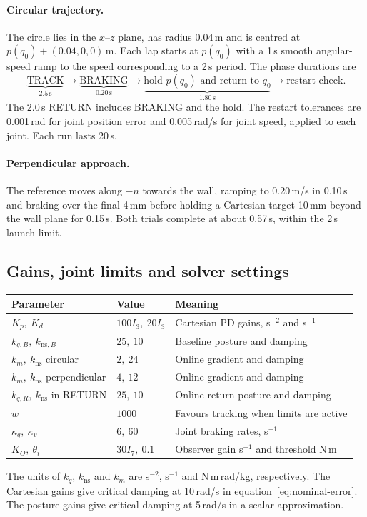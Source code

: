 \documentclass[11pt,a4paper]{article}
\begin{document}
\paragraph{Circular trajectory.}
The circle lies in the $x$--$z$ plane, has radius 0.04\,m and is centred at
$p(q_0)+(0.04,0,0)$\,m. Each lap starts at $p(q_0)$ with a 1\,s smooth
angular-speed ramp to the speed corresponding to a 2\,s period. The phase
durations are
\[
 \underbrace{\mathrm{TRACK}}_{2.5\,\mathrm{s}}
 \longrightarrow
 \underbrace{\mathrm{BRAKING}}_{0.20\,\mathrm{s}}
 \longrightarrow
 \underbrace{\text{hold }p(q_0)\text{ and return to }q_0}_{1.80\,\mathrm{s}}
 \longrightarrow
 \text{restart check}.
\]
The 2.0\,s RETURN includes BRAKING and the hold. The restart tolerances
are 0.001\,rad for joint position error and 0.005\,rad/s for joint speed,
applied to each joint. Each run lasts 20\,s.

\paragraph{Perpendicular approach.}
The reference moves along $-n$ towards the wall, ramping to 0.20\,m/s in
0.10\,s and braking over the final 4\,mm before holding a Cartesian target
10\,mm beyond the wall plane for 0.15\,s. Both trials complete at about
0.57\,s, within the 2\,s launch limit.

\subsection{Gains, joint limits and solver settings}
\begin{center}
\begin{tabular}{lll}
\toprule
Parameter & Value & Meaning\\
\midrule
$K_p,\ K_d$ & $100I_3,\ 20I_3$ & Cartesian PD gains, s$^{-2}$ and s$^{-1}$\\
$k_{q,B},\ k_{\mathrm{ns},B}$ & $25,\ 10$ & Baseline posture and damping\\
$k_m,\ k_{\mathrm{ns}}$ circular & $2,\ 24$ & Online gradient and damping\\
$k_m,\ k_{\mathrm{ns}}$ perpendicular & $4,\ 12$ & Online gradient and damping\\
$k_{q,R},\ k_{\mathrm{ns}}$ in RETURN & $25,\ 10$ & Online return posture and damping\\
$w$ & $1000$ & Favours tracking when limits are active\\
$\kappa_q,\ \kappa_v$ & $6,\ 60$ & Joint braking rates, s$^{-1}$\\
$K_O,\ \theta_i$ & $30I_7,\ 0.1$ & Observer gain s$^{-1}$ and threshold N\,m\\
\bottomrule
\end{tabular}
\end{center}
The units of $k_q$, $k_{\mathrm{ns}}$ and $k_m$ are s$^{-2}$, s$^{-1}$
and N\,m\,rad/kg, respectively. The Cartesian gains give critical damping
at 10\,rad/s in equation~\eqref{eq:nominal-error}. The posture gains give
critical damping at 5\,rad/s in a scalar approximation.
\end{document}
